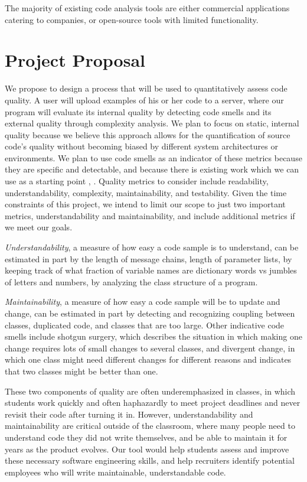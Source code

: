 \documentclass{sig-alternate}
\begin{document}
The majority of existing code analysis tools are either commercial applications catering to companies, or open-source tools with limited functionality.

\section{Project Proposal}
\label{sec:project_proposal}
We propose to design a process that will be used to quantitatively assess code quality. A user will upload examples of his or her code to a server, where our program will evaluate its internal quality by detecting code smells and its external quality through complexity analysis. We plan to focus on static, internal quality because we believe this approach allows for the quantification of source code's quality without becoming biased by different system architectures or environments. We plan to use code smells as an indicator of these metrics because they are specific and detectable, and because there is existing work which we can use as a starting point \cite{moha2009duchien}, \cite{palomba}. Quality metrics to consider include readability, understandability, complexity, maintainability, and testability. Given the time constraints of this project, we intend to limit our scope to just two important metrics, understandability and maintainability, and include additional metrics if we meet our goals. 

{\it Understandability}, a measure of how easy a code sample is to understand, can be estimated in part by the length of message chains, length of parameter lists, by keeping track of what fraction of variable names are dictionary words vs jumbles of letters and numbers, by analyzing the class structure of a program. 

{\it Maintainability}, a measure of how easy a code sample will be to update and change, can be estimated in part by detecting and recognizing coupling between classes, duplicated code, and classes that are too large. Other indicative code smells include shotgun surgery, which describes the situation in which making one change requires lots of small changes to several classes, and divergent change, in which one class might need different changes for different reasons and indicates that two classes might be better than one.

These two components of quality are often underemphasized in classes, in which students work quickly and often haphazardly to meet project deadlines and never revisit their code after turning it in. However, understandability and maintainability are critical outside of the classroom, where many people need to understand code they did not write themselves, and be able to maintain it for years as the product evolves. Our tool would help students assess and improve these necessary software engineering skills, and help recruiters identify potential employees who will write maintainable, understandable code.
\end{document}
